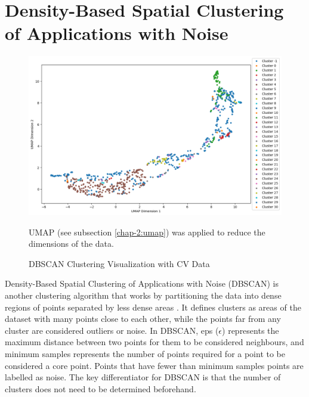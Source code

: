 \section{Density-Based Spatial Clustering of Applications with Noise}
\begin{figure}[h!]
  \centering
    \includegraphics[width=1.0\textwidth]{figures/dbscan.png}
    \caption{DBSCAN Clustering Visualization with CV Data}
    \label{dbscan}
    UMAP (see subsection \ref{chap-2:umap}) was applied to reduce the dimensions of the data.
\end{figure}
Density-Based Spatial Clustering of Applications with Noise (DBSCAN) is another clustering algorithm that works by partitioning the data into dense regions of points separated by less dense areas \cite{Ester1996ADA}. It defines clusters as areas of the dataset with many points close to each other, while the points far from any cluster are considered outliers or noise. In DBSCAN, eps ($\epsilon$) represents the maximum distance between two points for them to be considered neighbours, and minimum samples represents the number of points required for a point to be considered a core point. Points that have fewer than minimum samples points are labelled as noise. The key differentiator for DBSCAN is that the number of clusters does not need to be determined beforehand.  
